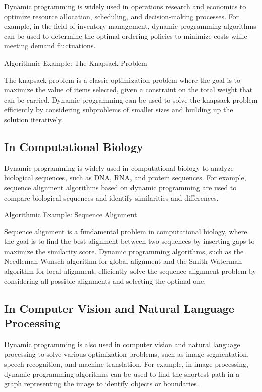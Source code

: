 \documentclass[12pt]{book} %
\begin{document}
Dynamic programming is widely used in operations research and economics to optimize resource allocation, scheduling, and decision-making processes. For example, in the field of inventory management, dynamic programming algorithms can be used to determine the optimal ordering policies to minimize costs while meeting demand fluctuations.

Algorithmic Example: The Knapsack Problem

The knapsack problem is a classic optimization problem where the goal is to maximize the value of items selected, given a constraint on the total weight that can be carried. Dynamic programming can be used to solve the knapsack problem efficiently by considering subproblems of smaller sizes and building up the solution iteratively.

\subsection{In Computational Biology}

Dynamic programming is widely used in computational biology to analyze biological sequences, such as DNA, RNA, and protein sequences. For example, sequence alignment algorithms based on dynamic programming are used to compare biological sequences and identify similarities and differences.

Algorithmic Example: Sequence Alignment

Sequence alignment is a fundamental problem in computational biology, where the goal is to find the best alignment between two sequences by inserting gaps to maximize the similarity score. Dynamic programming algorithms, such as the Needleman-Wunsch algorithm for global alignment and the Smith-Waterman algorithm for local alignment, efficiently solve the sequence alignment problem by considering all possible alignments and selecting the optimal one.

\subsection{In Computer Vision and Natural Language Processing}

Dynamic programming is also used in computer vision and natural language processing to solve various optimization problems, such as image segmentation, speech recognition, and machine translation. For example, in image processing, dynamic programming algorithms can be used to find the shortest path in a graph representing the image to identify objects or boundaries.
\end{document}
